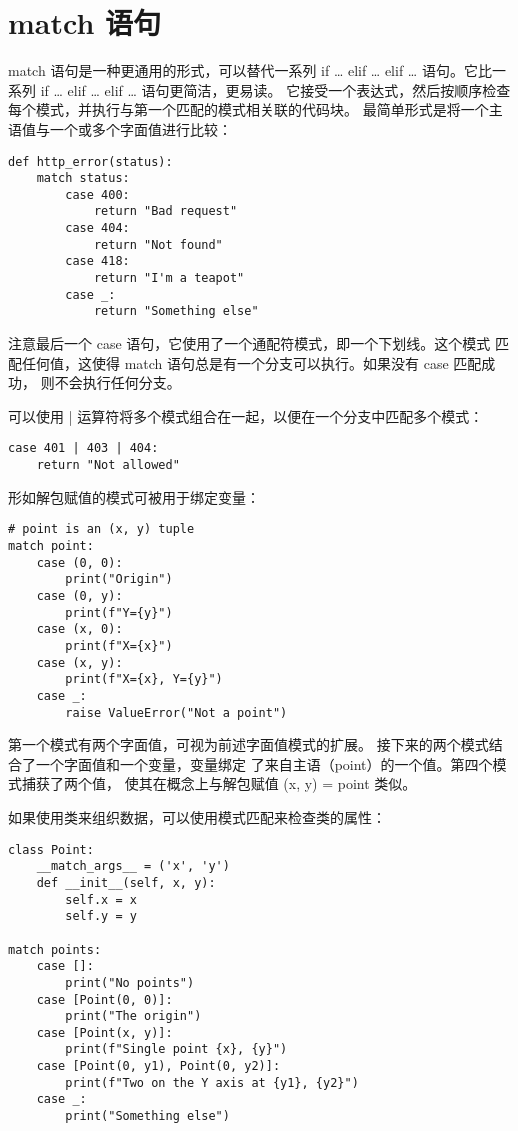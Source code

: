 \documentclass[a4paper, 12pt]{article}
\begin{document}
\section{match 语句}
match 语句是一种更通用的形式，可以替代一系列 if … elif … elif … 语句。它比一系列 if … elif … elif … 语句更简洁，更易读。
它接受一个表达式，然后按顺序检查每个模式，并执行与第一个匹配的模式相关联的代码块。
最简单形式是将一个主语值与一个或多个字面值进行比较：\par
\begin{listing}[h!]
\begin{verbatim}
def http_error(status):
    match status:
        case 400:
            return "Bad request"
        case 404:
            return "Not found"
        case 418:
            return "I'm a teapot"
        case _:
            return "Something else"
\end{verbatim}
\end{listing}
注意最后一个 case 语句，它使用了一个通配符模式，即一个下划线。这个模式
匹配任何值，这使得 match 语句总是有一个分支可以执行。如果没有 case 匹配成功，
则不会执行任何分支。\par
可以使用 | 运算符将多个模式组合在一起，以便在一个分支中匹配多个模式：\par
\begin{listing}[h!]
\begin{verbatim}
case 401 | 403 | 404:
    return "Not allowed"
\end{verbatim}
\end{listing}
形如解包赋值的模式可被用于绑定变量：\par
\begin{listing}[h!]
\begin{verbatim}
# point is an (x, y) tuple
match point:
    case (0, 0):
        print("Origin")
    case (0, y):
        print(f"Y={y}")
    case (x, 0):
        print(f"X={x}")
    case (x, y):
        print(f"X={x}, Y={y}")
    case _:
        raise ValueError("Not a point")
\end{verbatim}
\end{listing}
第一个模式有两个字面值，可视为前述字面值模式的扩展。
接下来的两个模式结合了一个字面值和一个变量，变量绑定
了来自主语（point）的一个值。第四个模式捕获了两个值，
使其在概念上与解包赋值 (x, y) = point 类似。\par
如果使用类来组织数据，可以使用模式匹配来检查类的属性：\par
\begin{listing}[h!]
\begin{verbatim}
class Point:
    __match_args__ = ('x', 'y')
    def __init__(self, x, y):
        self.x = x
        self.y = y

match points:
    case []:
        print("No points")
    case [Point(0, 0)]:
        print("The origin")
    case [Point(x, y)]:
        print(f"Single point {x}, {y}")
    case [Point(0, y1), Point(0, y2)]:
        print(f"Two on the Y axis at {y1}, {y2}")
    case _:
        print("Something else")
\end{verbatim}
\end{listing}
\end{document}
